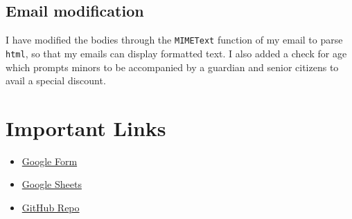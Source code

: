 \documentclass{article}
\begin{document}
\subsection{Email modification}
I have modified the bodies through the \texttt{MIMEText} function of my email to parse \texttt{html}\autocite{6}, so that my emails can display formatted text. I also added a check for age which prompts minors to be accompanied by a guardian and senior citizens to avail a special discount.
\section{Important Links}
\begin{itemize}
    \item \href{https://forms.gle/KnfyxSyh6hvjdoBu9}{Google Form}
    \item \href{https://docs.google.com/spreadsheets/d/16OCCYVb8J6uGF6t1GXo0IHV1P57_r_8tpJccRHVZVUA/edit?usp=sharing}{Google Sheets}
    \item \href{https://github.com/Hal-lucin-ogen8/SpreadsheetToken}{GitHub Repo}
\end{itemize}

\nocite{5}
\nocite{7}
\printbibliography
\end{document}
